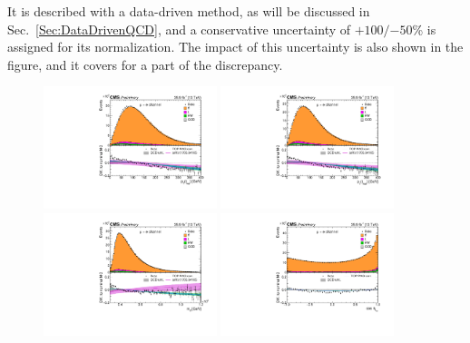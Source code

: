 It is described with a data-driven method, as will be discussed in Sec.~\ref{Sec:DataDrivenQCD}, and a conservative uncertainty of ${+100} / {-50}$\% is assigned for its normalization.
The impact of this uncertainty is also shown in the figure, and it covers for a part of the discrepancy.
\begin{figure}
  \centering
  \includegraphics[width=0.45\textwidth]{fig/chapt7/correction/PtTopLep.pdf}
  \includegraphics[width=0.45\textwidth]{fig/chapt7/correction/PtTopHad.pdf} \\
  \includegraphics[width=0.45\textwidth]{fig/chapt7/correction/MassTT.pdf}
  \includegraphics[width=0.45\textwidth]{fig/chapt7/correction/CosTopLepTT.pdf}

\end{figure}
